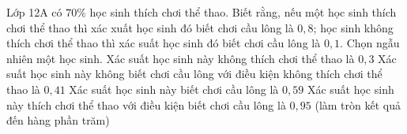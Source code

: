 \begin{ex}%
	Lớp 12A có $70\%$ học sinh thích chơi thể thao. Biết rằng, nếu một học sinh thích chơi thể thao thì xác  xuất học sinh đó biết chơi cầu lông là $0{,}8$; học sinh không thích chơi thể thao thì xác suất học sinh đó biết chơi cầu lông là $0{,}1$. Chọn ngẫu nhiên một học sinh.
	 \choiceTF
		{\True Xác suất học sinh  này không thích chơi thể thao là $0{,}3$}
		{Xác suất học sinh này  không biết chơi cầu lông với điều kiện không thích chơi thể thao là $0{,}41$}
		{\True Xác suất  học sinh này biết chơi cầu lông là $0{,}59$}
		{\True Xác suất học sinh này thích chơi thể thao với điều kiện biết chơi cầu lông là $0{,}95$ (làm tròn kết  quả đến hàng phần trăm)}
\end{ex}

